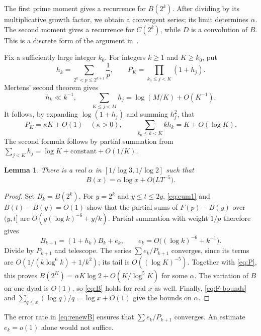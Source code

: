 \documentclass[10pt]{article}
\newtheorem{lem}[thm]{Lemma}
\begin{document}
The first prime moment gives a recurrence for $B(2^k)$. After dividing by its multiplicative growth factor, we obtain a convergent series; its limit determines $\alpha$. The second moment gives a recurrence for $C(2^k)$, while $D$ is a convolution of $B$. This is a discrete form of the argument in~\cite[Section~2]{EGPS}.

Fix a sufficiently large integer $k_0$. For integers $k\geq1$ and $K\geq k_0$, put
\[
 h_k=\sum_{2^k<p\leq2^{k+1}}\frac1p,\qquad
 P_K=\prod_{k_0\leq j<K}(1+h_j).
\]
Mertens' second theorem gives
\begin{equation}\label{eq:h}
 h_k\ll k^{-1},\qquad
 \sum_{K\leq j<M}h_j=\log(M/K)+O(K^{-1}).
\end{equation}
It follows, by expanding $\log(1+h_j)$ and summing $h_j^2$, that
\begin{equation}\label{eq:P}
 P_K=\kappa K+O(1)\quad(\kappa>0),\qquad
 \sum_{k_0\leq k<K}kh_k=K+O(\log K).
\end{equation}
The second formula follows by partial summation from $\sum_{j<K}h_j=\log K+\text{constant}+O(1/K)$.

\begin{lem}\label{lem:B}
There is a real $\alpha$ in $[1/\log3,1/\log2]$ such that
\begin{equation}\label{eq:B}
 B(x)=\alpha\log x+O\bigl(LT^{-5}\bigr).
\end{equation}
\end{lem}
\begin{proof}
Set $B_k=B(2^k)$. For $y=2^k$ and $y\leq t\leq2y$, \eqref{eq:cum1} and $B(t)-B(y)=O(1)$ show that the partial sums of $F(p)-B(y)$ over $(y,t]$ are $O(y(\log k)^{-6}+y/k)$. Partial summation with weight $1/p$ therefore gives
\begin{equation}\label{eq:renewB}
 B_{k+1}=(1+h_k)B_k+e_k,\qquad
 e_k=O\bigl((\log k)^{-6}+k^{-1}\bigr).
\end{equation}
Divide by $P_{k+1}$ and telescope. The series $\sum e_k/P_{k+1}$ converges, since its terms are $O(1/(k\log^6 k)+1/k^2)$; its tail is $O((\log K)^{-5})$. Together with \eqref{eq:P}, this proves $B(2^K)=\alpha K\log2+O(K/\log^5 K)$ for some $\alpha$. The variation of $B$ on one dyad is $O(1)$, so \eqref{eq:B} holds for real $x$ as well. Finally, \eqref{eq:F-bounds} and $\sum_{q\leq x}(\log q)/q=\log x+O(1)$ give the bounds on $\alpha$.
\end{proof}

The error rate in \eqref{eq:renewB} ensures that $\sum e_k/P_{k+1}$ converges. An estimate $e_k=o(1)$ alone would not suffice.
\end{document}
